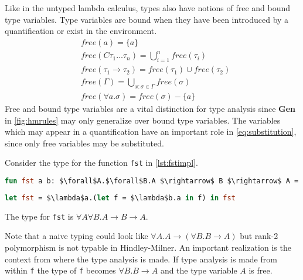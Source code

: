 \documentclass[11pt,oneside,a4paper]{report}
\begin{document}
Like in the untyped lambda calculus, types also have notions of free and bound type variables.
Type variables are bound when they have been introduced by a quantification or exist in the environment.
\begin{align}
	 & \textit{free}(a) = \{ a \}                                                              \\
	 & \textit{free}(C \tau_1 \dots \tau_n ) = \bigcup_{i = 1}^n \textit{free}(\tau_i)           \\
     & \textit{free}(\tau_1 \rightarrow \tau_2) = \textit{free}(\tau_1) \cup \textit{free}(\tau_2)          \\
	 & \textit{free}(\Gamma) = \bigcup_{x:\sigma \in \Gamma} \textit{free}(\sigma)             \\
	 & \textit{free}(\forall a . \sigma) = \textit{free}(\sigma) - \{ a \}                     
\end{align}
Free and bound type variables are a vital distinction for type analysis since \textbf{Gen} in \autoref{fig:hmrules} may only generalize over bound type variables.
The variables which may appear in a quantification have an important role in \autoref{eq:substitution}, since only free variables may be substituted.
\begin{exmp}
Consider the type for the function \texttt{fst} in \autoref{lst:fstimpl}.
\begin{lstlisting}[language=ML,caption={First function},label={lst:fstimplbad},mathescape=true]
fun fst a b: $\forall$A.$\forall$B.A $\rightarrow$ B $\rightarrow$ A = a;
\end{lstlisting}
\begin{lstlisting}[language=ML,caption={First function in lambda calculus},label={lst:fstimpl},mathescape=true]
let fst = $\lambda$a.(let f = $\lambda$b.a in f) in fst
\end{lstlisting}
    The type for \texttt{fst} is $\forall A \forall B . A \rightarrow B \rightarrow A$.

    Note that a naive typing could look like $\forall A  . A \rightarrow (\forall B . B \rightarrow A)$ but rank-2 polymorphism is not typable in Hindley-Milner.
    An important realization is the context from where the type analysis is made.
    If type analysis is made from within \texttt{f} the type of \texttt{f} becomes $\forall B . B \rightarrow A$ and the type variable $A$ is free.
\end{exmp}
\end{document}
